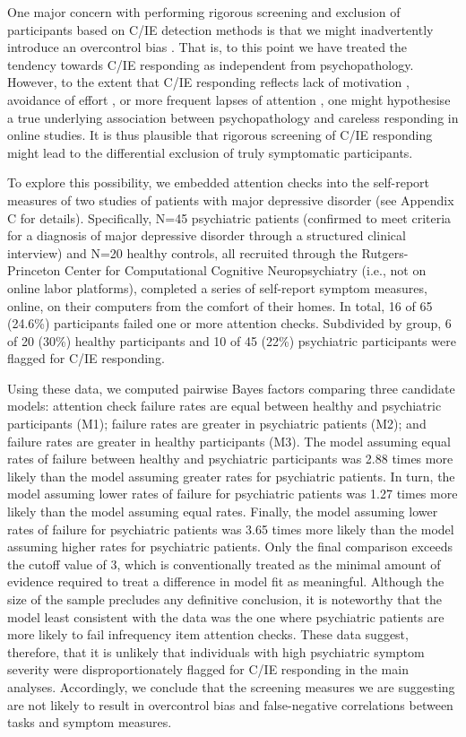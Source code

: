 \documentclass[a4paper,notitlepage,12pt]{article}
\begin{document}
\begin{refsection}[main]
One major concern with performing rigorous screening and exclusion of participants based on C/IE detection methods is that we might inadvertently introduce an overcontrol bias \cite{elwert2014endogenous}. That is, to this point we have treated the tendency towards C/IE responding as independent from psychopathology. However, to the extent that C/IE responding reflects lack of motivation \cite{barch2015mechanisms}, avoidance of effort \cite{cohen2001impairments, culbreth2016negative}, or more frequent lapses of attention \cite{kane2016individual, robison2017neurotic}, one might hypothesise a true underlying association between psychopathology and careless responding in online studies. It is thus plausible that rigorous screening of C/IE responding might lead to the differential exclusion of truly symptomatic participants. 

To explore this possibility, we embedded attention checks into the self-report measures of two studies of patients with major depressive disorder (see Appendix C for details). Specifically, N=45 psychiatric patients (confirmed to meet criteria for a diagnosis of major depressive disorder through a structured clinical interview) and N=20 healthy controls, all recruited through the Rutgers-Princeton Center for Computational Cognitive Neuropsychiatry (i.e., not on online labor platforms), completed a series of self-report symptom measures, online, on their computers from the comfort of their homes. In total, 16 of 65 (24.6\%) participants failed one or more attention checks. Subdivided by group, 6 of 20 (30\%) healthy participants and 10 of 45 (22\%) psychiatric participants were flagged for C/IE responding.

Using these data, we computed pairwise Bayes factors comparing three candidate models: attention check failure rates are equal between healthy and psychiatric participants (M1); failure rates are greater in psychiatric patients (M2); and failure rates are greater in healthy participants (M3). The model assuming equal rates of failure between healthy and psychiatric participants was 2.88 times more likely than the model assuming greater rates for psychiatric patients. In turn, the model assuming lower rates of failure for psychiatric patients was 1.27 times more likely than the model assuming equal rates. Finally, the model assuming lower rates of failure for psychiatric patients was 3.65 times more likely than the model assuming higher rates for psychiatric patients. Only the final comparison exceeds the cutoff value of 3, which is conventionally treated as the minimal amount of evidence required to treat a difference in model fit as meaningful. Although the size of the sample precludes any definitive conclusion, it is noteworthy that the model least consistent with the data was the one where psychiatric patients are more likely to fail infrequency item attention checks. These data suggest, therefore, that it is unlikely that individuals with high psychiatric symptom severity were disproportionately flagged for C/IE responding in the main analyses. Accordingly, we conclude that the screening measures we are suggesting are not likely to result in overcontrol bias and false-negative correlations between tasks and symptom measures.


\end{refsection}
\end{document}
